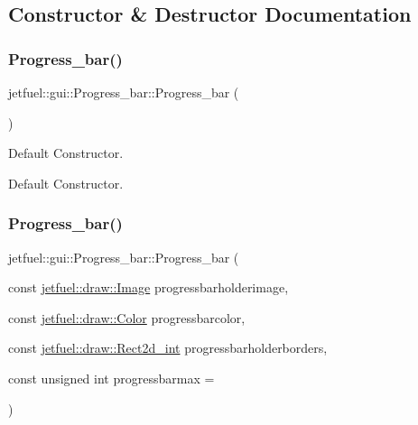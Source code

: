 \subsection{Constructor \& Destructor Documentation}
\mbox{\label{classjetfuel_1_1gui_1_1Progress__bar_a82ff3b06366efe839c6031281db9b9ac}} 
\subsubsection{\texorpdfstring{Progress\+\_\+bar()}{Progress\_bar()}\hspace{0.1cm}{\footnotesize\ttfamily [1/2]}}
{\footnotesize\ttfamily jetfuel\+::gui\+::\+Progress\+\_\+bar\+::\+Progress\+\_\+bar (\begin{DoxyParamCaption}{ }\end{DoxyParamCaption})\hspace{0.3cm}{\ttfamily [inline]}}



Default Constructor. 

Default Constructor. \mbox{\label{classjetfuel_1_1gui_1_1Progress__bar_a77c734bd7d04bd5f8a0f9bf6d2c600e5}} 
\subsubsection{\texorpdfstring{Progress\+\_\+bar()}{Progress\_bar()}\hspace{0.1cm}{\footnotesize\ttfamily [2/2]}}
{\footnotesize\ttfamily jetfuel\+::gui\+::\+Progress\+\_\+bar\+::\+Progress\+\_\+bar (\begin{DoxyParamCaption}\item[{const \hyperlink{classjetfuel_1_1draw_1_1Image}{jetfuel\+::draw\+::\+Image}}]{progressbarholderimage,  }\item[{const \hyperlink{classjetfuel_1_1draw_1_1Color}{jetfuel\+::draw\+::\+Color}}]{progressbarcolor,  }\item[{const \hyperlink{classjetfuel_1_1draw_1_1Rect2d}{jetfuel\+::draw\+::\+Rect2d\+\_\+int}}]{progressbarholderborders,  }\item[{const unsigned int}]{progressbarmax = {} }\end{DoxyParamCaption})}



